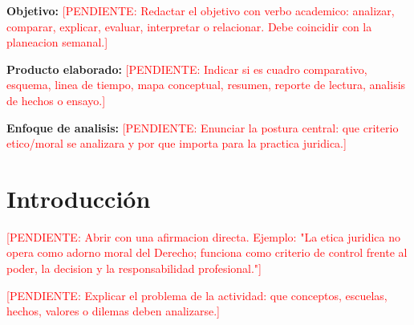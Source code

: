 \documentclass[
	spanish,
	letterpaper, oneside
]{article}
\newcommand{\pendiente}[1]{\textcolor{red}{[PENDIENTE: #1]}}
\begin{document}
\templatePortrait

\templatePagecfg
\onehalfspacing

\begin{abstractd}
	\textbf{Objetivo:} \pendiente{Redactar el objetivo con verbo academico: analizar, comparar, explicar, evaluar, interpretar o relacionar. Debe coincidir con la planeacion semanal.}

	\textbf{Producto elaborado:} \pendiente{Indicar si es cuadro comparativo, esquema, linea de tiempo, mapa conceptual, resumen, reporte de lectura, analisis de hechos o ensayo.}

	\textbf{Enfoque de analisis:} \pendiente{Enunciar la postura central: que criterio etico/moral se analizara y por que importa para la practica juridica.}
\end{abstractd}

\templateIndex

\templateFinalcfg


%
\section{Introducción}

\pendiente{Abrir con una afirmacion directa. Ejemplo: "La etica juridica no opera como adorno moral del Derecho; funciona como criterio de control frente al poder, la decision y la responsabilidad profesional."}

\pendiente{Explicar el problema de la actividad: que conceptos, escuelas, hechos, valores o dilemas deben analizarse.}
\end{document}
